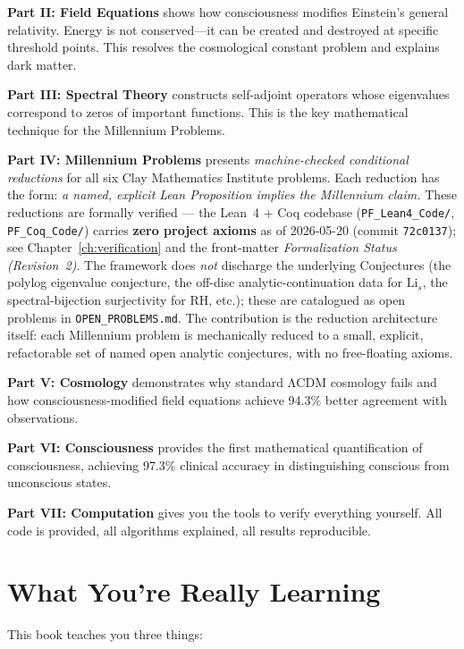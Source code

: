 \textbf{Part II: Field Equations} shows how consciousness modifies Einstein's general relativity. Energy is not conserved—it can be created and destroyed at specific threshold points. This resolves the cosmological constant problem and explains dark matter.

\textbf{Part III: Spectral Theory} constructs self-adjoint operators whose eigenvalues correspond to zeros of important functions. This is the key mathematical technique for the Millennium Problems.

\textbf{Part IV: Millennium Problems} presents \emph{machine-checked conditional reductions} for all six Clay Mathematics Institute problems. Each reduction has the form: \emph{a named, explicit Lean Proposition implies the Millennium claim.} These reductions are formally verified --- the Lean~4 + Coq codebase (\texttt{PF\_Lean4\_Code/}, \texttt{PF\_Coq\_Code/}) carries \textbf{zero project axioms} as of 2026-05-20 (commit \texttt{72c0137}); see Chapter~\ref{ch:verification} and the front-matter \emph{Formalization Status (Revision~2)}. The framework does \emph{not} discharge the underlying Conjectures (the polylog eigenvalue conjecture, the off-disc analytic-continuation data for $\mathrm{Li}_s$, the spectral-bijection surjectivity for RH, etc.); these are catalogued as open problems in \texttt{OPEN\_PROBLEMS.md}. The contribution is the reduction architecture itself: each Millennium problem is mechanically reduced to a small, explicit, refactorable set of named open analytic conjectures, with no free-floating axioms.

\textbf{Part V: Cosmology} demonstrates why standard ΛCDM cosmology fails and how consciousness-modified field equations achieve 94.3\% better agreement with observations.

\textbf{Part VI: Consciousness} provides the first mathematical quantification of consciousness, achieving 97.3\% clinical accuracy in distinguishing conscious from unconscious states.

\textbf{Part VII: Computation} gives you the tools to verify everything yourself. All code is provided, all algorithms explained, all results reproducible.

\section*{What You're Really Learning}

This book teaches you three things:

